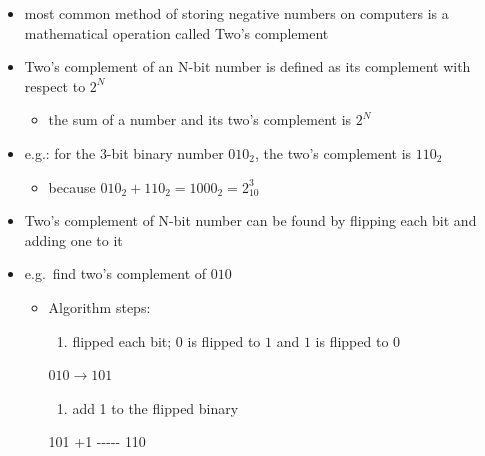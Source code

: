 \documentclass[11pt]{article}
\providecommand{\tightlist}{%
      \setlength{\itemsep}{0pt}\setlength{\parskip}{0pt}}
\newenvironment{Shaded}{}{}
\newcommand{\ExtensionTok}[1]{{#1}}
\begin{document}
\begin{itemize}
\tightlist
\item
  most common method of storing negative numbers on computers is a
  mathematical operation called Two's complement
\item
  Two's complement of an N-bit number is defined as its complement with
  respect to \(2^N\)

  \begin{itemize}
  \tightlist
  \item
    the sum of a number and its two's complement is \(2^N\)
  \end{itemize}
\item
  e.g.: for the 3-bit binary number \(010_2\), the two's complement is
  \(110_2\)

  \begin{itemize}
  \tightlist
  \item
    because \(010_2 + 110_2 = 1000_2 = 2^3_{10}\)
  \end{itemize}
\item
  Two's complement of N-bit number can be found by flipping each bit and
  adding one to it
\item
  e.g.~find two's complement of \(010\)

  \begin{itemize}
  \item
    Algorithm steps:

    \begin{enumerate}
    \def\labelenumi{\arabic{enumi}.}
    \tightlist
    \item
      flipped each bit; \(0\) is flipped to \(1\) and \(1\) is flipped
      to \(0\)
    \end{enumerate}

    \(010 \rightarrow 101\)

    \begin{enumerate}
    \def\labelenumi{\arabic{enumi}.}
    \setcounter{enumi}{1}
    \tightlist
    \item
      add 1 to the flipped binary
    \end{enumerate}

\begin{Shaded}
\begin{Highlighting}[]
    \ExtensionTok{101}
     \ExtensionTok{+1}
   \ExtensionTok{{-}{-}{-}{-}{-}}
    \ExtensionTok{110}
\end{Highlighting}
\end{Shaded}
  \end{itemize}
\end{itemize}
\end{document}
